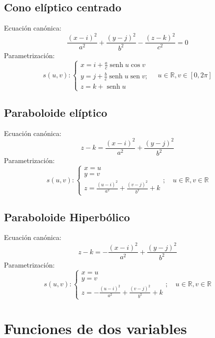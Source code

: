 \subsection{Cono elíptico centrado}
Ecuación canónica:
$$
\frac{(x-i)^{2}}{a^{2}}+\frac{(y-j)^{2}}{b^{2}}-\frac{(z-k)^{2}}{c^{2}}=0
$$
Parametrización:
$$
s(u, v):\left\{\begin{array}{l}
x=i+\frac{a}{c} \operatorname{senh} u \cos v \\
y=j+\frac{b}{c} \operatorname{senh} u \operatorname{sen} v ; \\
z=k+\operatorname{senh} u
\end{array} \quad u \in \mathbb{R}, v \in[0,2 \pi]\right.
$$

\subsection{Paraboloide elíptico}
Ecuación canónica:
$$
z-k=\frac{(x-i)^{2}}{a^{2}}+\frac{(y-j)^{2}}{b^{2}}
$$
Parametrización:
$$
s(u, v):\left\{\begin{array}{l}
x=u \\
y=v \\
z=\frac{(u-i)^{2}}{a^{2}}+\frac{(v-j)^{2}}{b^{2}}+k
\end{array} ; \quad u \in \mathbb{R}, v \in \mathbb{R}\right.
$$

\subsection{Paraboloide Hiperbólico}
Ecuación canónica:
$$
z-k=-\frac{(x-i)^{2}}{a^{2}}+\frac{(y-j)^{2}}{b^{2}}
$$
Parametrización:
$$
s(u, v):\left\{\begin{array}{l}
x=u \\
y=v \\
z=-\frac{(u-i)^{2}}{a^{2}}+\frac{(v-j)^{2}}{b^{2}}+k
\end{array} ; \quad u \in \mathbb{R}, v \in \mathbb{R}\right.
$$
\section{Funciones de dos variables}

